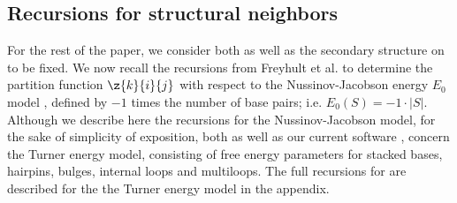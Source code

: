 \subsection*{Recursions for structural neighbors}

For the rest of the paper, we consider both \seq as well as the
secondary structure \strSt on \seq to be fixed. We now recall the
recursions from Freyhult et al. \citep{Freyhult.ab05} to determine
the partition function $\z{k}{i}{j}$ with
respect to the Nussinov-Jacobson
energy $E_0$ model \citep{nussinovJacobson}, defined by
$-1$ times the number of base pairs; i.e. $E_0(S) = -1 \cdot |S|$.
Although we describe here the recursions for the Nussinov-Jacobson
model, for the sake of
simplicity of exposition, both \rnabor
\citep{Freyhult.ab05} as well as our current software \fftbor,
concern the Turner energy model, consisting of free energy parameters for
stacked bases, hairpins, bulges, internal loops and multiloops. The full
recursions for \fftbor are described for the
the Turner energy model in the appendix.

